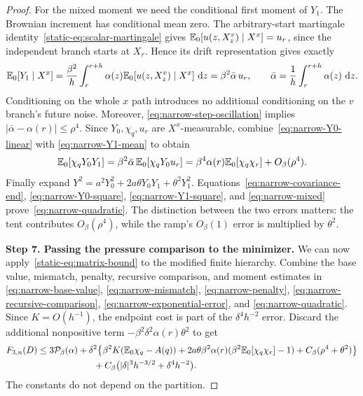 \begin{proof}
For the mixed moment we need the conditional first moment of $Y_1$.
The Brownian increment has conditional mean zero. The arbitrary-start
martingale identity~\eqref{static-eq:scalar-martingale} gives
$\mathbb E_0[u(z,X_z^v)\mid X^x]=u_r$, since the independent branch
starts at $X_r$. Hence its drift representation gives exactly
\begin{equation}\label{eq:narrow-Y1-mean}
 \mathbb E_0[Y_1\mid X^x]
 =\frac{\beta^2}{h}\int_r^{r+h}
         \alpha(z)\mathbb E_0[u(z,X^v_z)\mid X^x]\,\,\mathrm d z
 =\beta^2\bar\alpha\,u_r,\qquad
 \bar\alpha=\frac1h\int_r^{r+h}\alpha(z)\,\,\mathrm d z.
\end{equation}
Conditioning on the whole $x$ path introduces no additional
conditioning on the $v$ branch's future noise. Moreover,
\eqref{eq:narrow-step-oscillation} implies
$|\bar\alpha-\alpha(r)|\le\rho^4$. Since $Y_0,\chi_q,u_r$ are
$X^x$-measurable, combine~\eqref{eq:narrow-Y0-linear} with
\eqref{eq:narrow-Y1-mean} to obtain
\begin{equation}\label{eq:narrow-mixed}
 \mathbb E_0[\chi_qY_0Y_1]
 =\beta^2\bar\alpha\,\mathbb E_0[\chi_qY_0u_r]
 =\beta^4\alpha(r)\mathbb E_0[\chi_q\chi_r]+O_\beta(\rho^4).
\end{equation}
Finally expand $Y^2=a^2Y_0^2+2a\theta Y_0Y_1+\theta^2Y_1^2$.
Equations~\eqref{eq:narrow-covariance-end},
\eqref{eq:narrow-Y0-square}, \eqref{eq:narrow-Y1-square}, and
\eqref{eq:narrow-mixed} prove~\eqref{eq:narrow-quadratic}.
The distinction between the two errors matters: the tent contributes
$O_\beta(\rho^4)$, while the ramp's $O_\beta(1)$ error is multiplied
by $\theta^2$.

\par\medskip\noindent\textbf{Step 7. Passing the pressure comparison to the minimizer.}\enspace
We can now apply~\eqref{static-eq:matrix-bound} to the modified finite
hierarchy. Combine the base value, mismatch, penalty, recursive
comparison, and moment estimates in
\eqref{eq:narrow-base-value}, \eqref{eq:narrow-mismatch},
\eqref{eq:narrow-penalty}, \eqref{eq:narrow-recursive-comparison},
\eqref{eq:narrow-exponential-error}, and
\eqref{eq:narrow-quadratic}. Since $K=O(h^{-1})$, the endpoint
cost is part of the $\delta^4h^{-2}$ error. Discard the additional
nonpositive term $-\beta^2\delta^2\alpha(r)\theta^2$ to get
\begin{align}
 F_{3,n}(D)\le 3\mathcal P_\beta(\alpha)
 +\delta^2\bigl\{&
   \beta^2K(\mathbb E_0\chi_q-A(q))
   +2a\theta\beta^2\alpha(r)
                    (\beta^2\mathbb E_0[\chi_q\chi_r]-1)
   +C_\beta(\rho^4+\theta^2)\bigr\}
 \notag\\
 &\hspace{-1em}
   +C_\beta\bigl(|\delta|^3h^{-3/2}+\delta^4h^{-2}\bigr).
 \label{eq:narrow-step-pressure}
\end{align}
The constants do not depend on the partition.


\end{proof}
